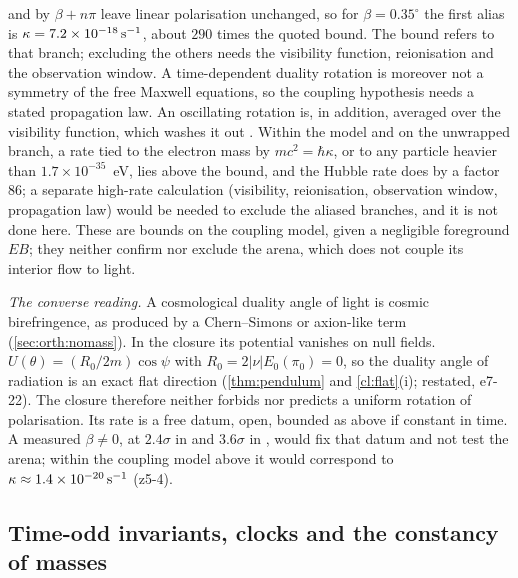and by $\beta+n\pi$ leave linear polarisation unchanged, so for $\beta=0.35^\circ$ the first alias is $\kappa=7.2\times10^{-18}\,{\rm s^{-1}}$, about $290$ times the
quoted bound. The bound refers to that branch; excluding the others needs the visibility function, reionisation and the observation window. A
time-dependent duality rotation is moreover not a symmetry of the free Maxwell equations, so the coupling hypothesis needs a stated propagation
law. An oscillating rotation is, in addition, averaged over the visibility function, which washes it out \cite{FedderkeGrahamRajendran19}. Within the model and on the unwrapped branch, a rate tied to the electron mass by $mc^2=\hbar\kappa$, or to any particle heavier than
$1.7\times10^{-35}$~eV, lies above the bound, and the Hubble rate does by a factor $86$; a separate high-rate calculation (visibility,
reionisation, observation window, propagation law) would be needed to exclude the aliased branches, and it is not done here. These are bounds on
the coupling model, given a negligible foreground $EB$; they neither confirm nor exclude the arena, which does not couple its interior flow to
light.

\emph{The converse reading.} A cosmological duality angle of light is cosmic birefringence, as produced by a Chern--Simons or axion-like term \cite{CarrollFieldJackiw90} (\cref{sec:orth:nomass}). In the closure its potential vanishes on null fields. $U(\theta)=(R_0/2m)\cos\psi$ with
$R_0=2|\nu|E_0(\pi_0)=0$, so the duality angle of radiation is an exact flat direction (\cref{thm:pendulum} and \cref{cl:flat}(i); restated,
e7-22). The closure therefore neither forbids nor predicts a uniform rotation of polarisation. Its rate is a free datum, open, bounded as above
if constant in time. A measured $\beta\neq0$, at $2.4\sigma$ in \cite{MinamiKomatsu20} and $3.6\sigma$ in \cite{EskiltKomatsu22}, would fix that
datum and not test the arena; within the coupling model above it would correspond to $\kappa\approx1.4\times10^{-20}\,{\rm s^{-1}}$ (z5-4).

\subsection{Time-odd invariants, clocks and the constancy of masses}
\label{e7:sec:timeodd}


